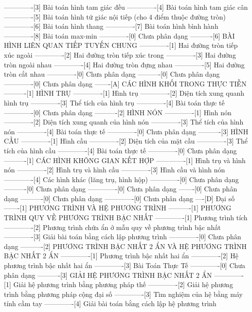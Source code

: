 -------------[3] Bài toán hình tam giác đều
-------------[4] Bài toán hình tam giác cân
-------------[5] Bài toán hình tứ giác nội tiếp (cho 4 điểm thuộc đường tròn)
-------------[6] Bài toán hình thang
-------------[7] Bài toán hình bình hành
-------------[8] Bài toán max-min
-------------[0] Chưa phân dạng
----------[6] BÀI HÌNH LIÊN QUAN TIẾP TUYẾN CHUNG
-------------[1] Hai đường tròn tiếp xúc ngoài
-------------[2] Hai đường tròn tiếp xúc trong
-------------[3] Hai đường tròn ngoài nhau
-------------[4] Hai đường tròn đựng nhau
-------------[5] Hai đường tròn cắt nhau
-------------[0] Chưa phân dạng
----------[0] Chưa phân dạng
-------------[0] Chưa phân dạng
-------[A] CÁC HÌNH KHỐI TRONG THỰC TIỄN
----------[1] HÌNH TRỤ
-------------[1] Hình trụ
-------------[2] Diện tích xung quanh hình trụ
-------------[3] Thể tích của hình trụ
-------------[4] Bài toán thực tế
-------------[0] Chưa phân dạng
----------[2] HÌNH NÓN
-------------[1] Hình nón
-------------[2] Diện tích xung quanh của hình nón
-------------[3] Thể tích của hình nón
-------------[4] Bài toán thực tế
-------------[0] Chưa phân dạng
----------[3] HÌNH CẦU
-------------[1] Hình cầu
-------------[2] Diện tích của mặt cầu
-------------[3] Thể tích của hình cầu
-------------[4] Bài toán thực tế
-------------[0] Chưa phân dạng
----------[1] CÁC HÌNH KHÔNG GIAN KẾT HỢP
-------------[1] Hình trụ và hình nón
-------------[2] Hình trụ và hình cầu
-------------[3] Hình cầu và hình nón
-------------[4] Các hình khác (lăng trụ, hình hộp)
-------------[0] Chưa phân dạng
----------[0] Chưa phân dạng
-------------[0] Chưa phân dạng
-------[0] Chưa phân dạng
----------[0] Chưa phân dạng
-------------[0] Chưa phân dạng
----[D] Đại số
-------[1] PHƯƠNG TRÌNH VÀ HỆ PHƯƠNG TRÌNH
----------[1] PHƯƠNG TRÌNH QUY VỀ PHƯƠNG TRÌNH BẬC NHẤT
-------------[1] Phương trình tích
-------------[2] Phương trình chứa ẩn ở mẫu quy về phương trình bậc nhất
-------------[3] Giải bài toán bằng cách lập phương trình
-------------[0] Chưa phân dạng
----------[2] PHƯƠNG TRÌNH BẬC NHẤT 2 ẨN VÀ HỆ PHƯƠNG TRÌNH BẬC NHẤT 2 ẨN
-------------[1] Phương trình bậc nhất hai ẩn
-------------[2] Hệ phương trình bậc nhất hai ẩn
-------------[3] Bài Toán Thực Tế
-------------[0] Chưa phân dạng
----------[3] GIẢI HỆ PHƯƠNG TRÌNH BẬC NHẤT 2 ẨN
-------------[1] Giải hệ phương trình bằng phương pháp thế
-------------[2] Giải hệ phương trình bằng phương pháp cộng đại số
-------------[3] Tìm nghiệm của hệ bằng máy tính cầm tay
-------------[4] Giải bài toán bằng cách lập hệ phương trình
